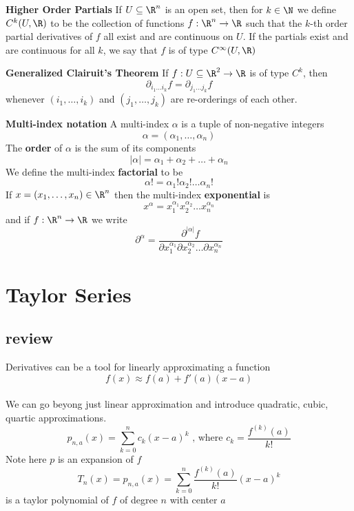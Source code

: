 \documentclass[11pt]{article}
\begin{document}
  \begin{defn}
    \label{Higher Order Partials}\textbf{Higher Order Partials} If $U\subseteq \R^n$ is an open set, then for $k\in\N$ we define $C^k(U, \R)$ to be the collection of functions $f:\R^n \rightarrow \R$ such that the $k$-th order partial derivatives of $f$ all exist and are continuous on $U$. If the partials exist and are continuous for all $k$, we say that $f$ is of type $C^{\infty}(U, \R)$
  \end{defn}

  \begin{theorem}
    \label{Generalized Clairuit's Theorem} \textbf{Generalized Clairuit's Theorem} If $f:U\subseteq \R^2 \rightarrow \R$ is of type $C^k$, then
    \[
      \partial_{i_1 \dots i_k} f = \partial_{j_1\dots j_k} f
    \]
    whenever $(i_1, \dots, i_k)$ and $(j_1, \dots, j_k)$ are re-orderings of each other.
  \end{theorem}


  \begin{defn}
    \label{Multi-indices}\textbf{Multi-index notation}
    A multi-index $\alpha$ is a tuple of non-negative integers
    \[
      \alpha = (\alpha_1, \dots, \alpha_n)
    \]
    The \textbf{order}  of $\alpha$ is the sum of its components
    \[
      | \alpha | = \alpha_1 + \alpha_2 + \dots + \alpha_n
    \]
    We define the multi-index \textbf{factorial} to be
    \[
      \alpha ! = \alpha_1 ! \alpha_2 ! \dots \alpha_n !
    \]
    If $x = (x_1, \dots, x_n)\in\R^n$ then the multi-index \textbf{exponential} is
    \[
      x^{\alpha} = x_1^{\alpha_1} x_2^{\alpha_2} \dots x_n^{\alpha_n}
    \]
    and if $f:\R^n \rightarrow \R$ we write
    \[
      \partial^{\alpha} = \frac{\partial^{| \alpha |} f}{\partial x_1^{\alpha_1} \partial x_2^{\alpha_2} \dots \partial x_n^{\alpha_n}}
    \]
  \end{defn}

  \section{Taylor Series}

  \subsection{review}

  Derivatives can be a tool for linearly approximating a function
  \[
    f(x) \approx f(a) + f'(a)(x-a)
  \]
  \\We can go beyong just linear approximation and introduce quadratic, cubic, quartic approximations.
  \[
    p_{n,a} (x) = \sum_{k=0}^{n} c_k (x-a)^k \text{ , where } c_k = \frac{f^{(k)}(a)}{k!}
  \]
  Note here $p$ is an expansion of $f$
  \[
    T_n(x) = p_{n,a}(x) = \sum_{k=0}^{n} \frac{f^{(k)}(a)}{k!} (x-a)^k
  \]
  is a taylor polynomial of $f$ of degree $n$ with center $a$
\end{document}
